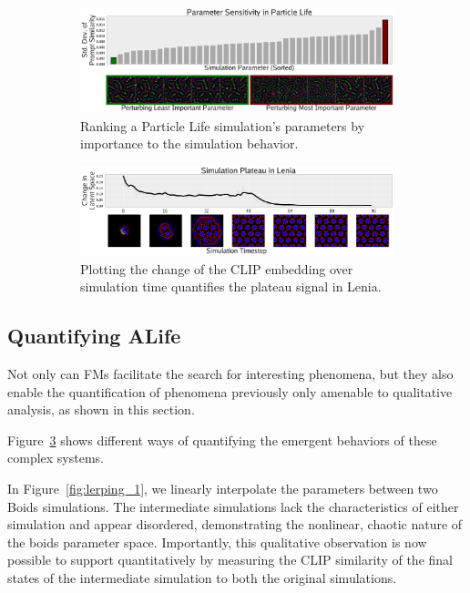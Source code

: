 \documentclass{article}
\begin{document}
\begin{figure}[htp]
\begin{subfigure}{1.0\textwidth}
        \centering
        \includegraphics[width=\textwidth]{figs/lerp_plife_sens_compressed.pdf}
        \vspace{-6mm}
        \caption{
        Ranking a Particle Life simulation's parameters by importance to the simulation behavior.
        }
        \label{fig:lerping_3}
    \end{subfigure}
    \begin{subfigure}{1.0\textwidth}
        \centering
        \includegraphics[width=\textwidth]{figs/lerp_lenia_compressed.pdf}
        \vspace{-6mm}
        \caption{
        Plotting the change of the CLIP embedding over simulation time quantifies the plateau signal in Lenia.
        }
        \label{fig:lerping_4}
    \end{subfigure}
    \caption{
    }
    \label{fig:lerping}
\end{figure}


\subsection{Quantifying ALife}
Not only can FMs facilitate the search for interesting phenomena, but they also enable the quantification of phenomena previously only amenable to qualitative analysis, as shown in this section.

Figure~\ref{fig:lerping} shows different ways of quantifying the emergent behaviors of these complex systems.

In Figure~\ref{fig:lerping_1}, we linearly interpolate the parameters between two Boids simulations.
The intermediate simulations lack the characteristics of either simulation and appear disordered, demonstrating the nonlinear, chaotic nature of the boids parameter space.
Importantly, this qualitative observation is now possible to support quantitatively by measuring the CLIP similarity of the final states of the intermediate simulation to both the original simulations.
\end{document}
